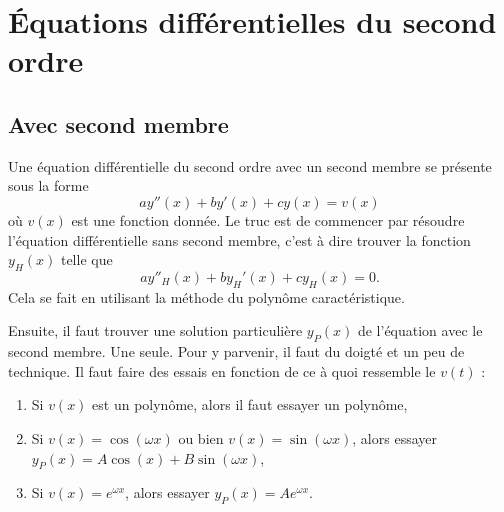 \section{Équations différentielles du second ordre}

\subsection{Avec second membre}

Une équation différentielle du second ordre avec un second membre se présente sous la forme
\begin{equation}
	ay''(x)+by'(x)+cy(x)=v(x)
\end{equation}
où $v(x)$ est une fonction donnée. Le truc est de commencer par résoudre l'équation différentielle sans second membre, c'est à dire trouver la fonction $y_H(x)$ telle que
\begin{equation}
	ay''_H(x)+by_H'(x)+cy_H(x)=0.
\end{equation}
Cela se fait en utilisant la méthode du polynôme caractéristique.

Ensuite, il faut trouver une solution particulière $y_P(x)$ de l'équation avec le second membre. Une seule. Pour y parvenir, il faut du doigté et un peu de technique. Il faut faire des essais en fonction de ce à quoi ressemble le $v(t)$ :
\begin{enumerate}

	\item
		Si $v(x)$ est un polynôme, alors il faut essayer un polynôme,

	\item
		Si $v(x)=\cos(\omega x)$ ou bien $v(x)=\sin(\omega x)$, alors essayer $y_P(x)=A\cos(x)+B\sin(\omega x)$,

	\item
		Si $v(x)= e^{\omega x}$, alors essayer $y_P(x)=A e^{\omega x}$.

\end{enumerate}


